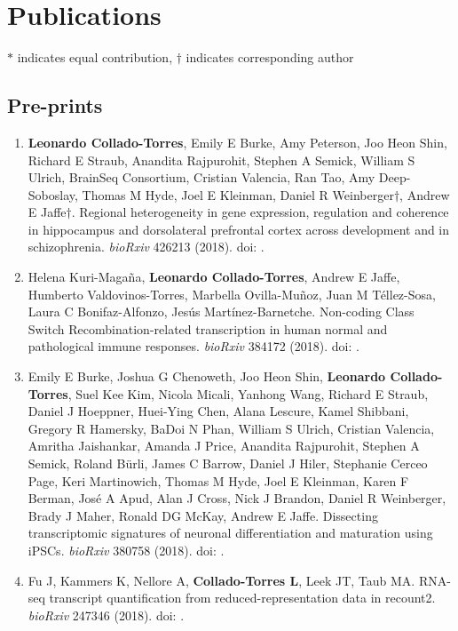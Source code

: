 \section{Publications}

$*$ indicates equal contribution, $\dagger$ indicates corresponding author

\subsection{Pre-prints}
    \begin{enumerate}
        \item \textbf{Leonardo Collado-Torres}, Emily E Burke, Amy Peterson, Joo Heon Shin, Richard E Straub, Anandita Rajpurohit, Stephen A Semick, William S Ulrich, BrainSeq Consortium, Cristian Valencia, Ran Tao, Amy Deep-Soboslay, Thomas M Hyde, Joel E Kleinman, Daniel R Weinberger$\dagger$, Andrew E Jaffe$\dagger$. Regional heterogeneity in gene expression, regulation and coherence in hippocampus and dorsolateral prefrontal cortex across development and in schizophrenia. \emph{bioRxiv} 426213 (2018). doi: .
        
        \item Helena Kuri-Magaña, \textbf{Leonardo Collado-Torres}, Andrew E Jaffe, Humberto Valdovinos-Torres, Marbella Ovilla-Muñoz, Juan M Téllez-Sosa, Laura C Bonifaz-Alfonzo, Jesús Martínez-Barnetche. Non-coding Class Switch Recombination-related transcription in human normal and pathological immune responses. \emph{bioRxiv} 384172 (2018). doi: .
        
        \item Emily E Burke, Joshua G Chenoweth, Joo Heon Shin, \textbf{Leonardo Collado-Torres}, Suel Kee Kim, Nicola Micali, Yanhong Wang, Richard E Straub, Daniel J Hoeppner, Huei-Ying Chen, Alana Lescure, Kamel Shibbani, Gregory R Hamersky, BaDoi N Phan, William S Ulrich, Cristian Valencia, Amritha Jaishankar, Amanda J Price, Anandita Rajpurohit, Stephen A Semick, Roland Bürli, James C Barrow, Daniel J Hiler, Stephanie Cerceo Page, Keri Martinowich, Thomas M Hyde, Joel E Kleinman, Karen F Berman, José A Apud, Alan J Cross, Nick J Brandon, Daniel R Weinberger, Brady J Maher, Ronald DG McKay, Andrew E Jaffe. Dissecting transcriptomic signatures of neuronal differentiation and maturation using iPSCs. \emph{bioRxiv} 380758 (2018). doi: .
        
        \item Fu J, Kammers K, Nellore A, \textbf{Collado-Torres L}, Leek JT, Taub MA. RNA-seq transcript quantification from reduced-representation data in recount2. \emph{bioRxiv} 247346 (2018). doi: .
    \end{enumerate}
